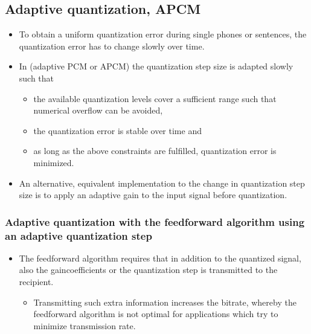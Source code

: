 \documentclass[letterpaper,10pt,english]{jupyterBook}
\begin{document}
\subsection{Adaptive quantization, APCM}
\label{\detokenize{Representations/Waveform:adaptive-quantization-apcm}}\begin{itemize}
\item {} 
\sphinxAtStartPar
To obtain a uniform quantization error during single phones or
sentences, the quantization error has to change slowly over time.

\item {} 
\sphinxAtStartPar
In  (adaptive PCM or APCM) the quantization
step size is adapted slowly such that
\begin{itemize}
\item {} 
\sphinxAtStartPar
the available quantization levels cover a sufficient range such
that numerical overflow can be avoided,

\item {} 
\sphinxAtStartPar
the quantization error is stable over time and

\item {} 
\sphinxAtStartPar
as long as the above constraints are fulfilled, quantization
error is minimized.

\end{itemize}

\item {} 
\sphinxAtStartPar
An alternative, equivalent implementation to the change in
quantization step size is to apply an adaptive gain to the input
signal before quantization.

\end{itemize}

\sphinxAtStartPar
{}


\subsubsection{Adaptive quantization with the feed\sphinxhyphen{}forward algorithm using an adaptive quantization step}
\label{\detokenize{Representations/Waveform:adaptive-quantization-with-the-feed-forward-algorithm-using-an-adaptive-quantization-step}}\begin{itemize}
\item {} 
\sphinxAtStartPar
The feed\sphinxhyphen{}forward algorithm requires that in addition to the
quantized signal, also the gain\sphinxhyphen{}coefficients or the quantization
step is transmitted to the recipient.
\begin{itemize}
\item {} 
\sphinxAtStartPar
Transmitting such extra information increases the bit\sphinxhyphen{}rate,
whereby the feed\sphinxhyphen{}forward algorithm is not optimal for
applications which try to minimize transmission rate.

\end{itemize}

\end{itemize}
\end{document}
